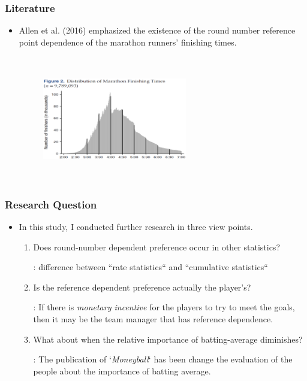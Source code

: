 \documentclass[dvipdfmx,12pt]{beamer}
\begin{document}
\begin{frame}\frametitle{Literature}
  \begin{itemize}
    \item Allen et al. (2016) emphasized the existence of the round number
    reference point dependence of the marathon runners' finishing times.

    \begin{figure}
      \includegraphics[width = 6.3cm, height = 5.5cm]{fig_tab/mt_fig2.pdf}
    \end{figure}
  \end{itemize}
\end{frame}

\begin{frame}\frametitle{Research Question}
  \begin{itemize}
    \item In this study, I conducted further research in three view points.
    \begin{enumerate}
      \item Does round-number dependent preference occur in other statistics?

      : difference between ``rate statistics`` and ``cumulative statistics``

      \item Is the reference dependent preference actually the player's?

      : If there is \textit{monetary incentive} for the players to try to
      meet the goals, then it may be the team manager that has reference
      dependence.

      \item What about when the relative importance of batting-average
      diminishes?

      : The publication of `\textit{Moneyball}` has been change the evaluation
      of the people about the importance of batting average.
    \end{enumerate}
  \end{itemize}
\end{frame}
\end{document}
